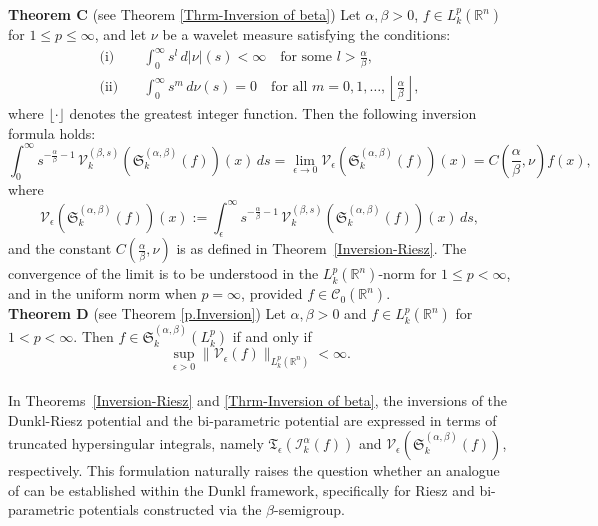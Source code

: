 \documentclass[11pt,a4paper,reqno]{amsproc}
\theoremstyle{definition}
\theoremstyle{remark}
\numberwithin{equation}{section}
\begin{document}
\noindent\textbf{Theorem C} (see Theorem \ref{Thrm-Inversion of beta}) Let \( \alpha, \beta > 0 \), \( f \in L_k^p(\mathbb{R}^n) \) for \( 1 \leq p \leq \infty \), and let \( \nu \) be a wavelet measure satisfying the conditions:
\begin{align*}
\text{(i)} & \quad \int_0^\infty s^{l} \, d|\nu|(s) < \infty \quad \text{for some } l > \frac{\alpha}{\beta}, \\
\text{(ii)} & \quad \int_0^\infty s^m \, d\nu(s) = 0 \quad \text{for all } m = 0, 1, \ldots, \left\lfloor \frac{\alpha}{\beta} \right\rfloor,
\end{align*}
where \( \lfloor \cdot \rfloor \) denotes the greatest integer function. Then the following inversion formula holds:
\[
\int_0^\infty s^{-\frac{\alpha}{\beta}-1} \, \mathcal{V}_k^{(\beta,s)}\left( \mathfrak{S}_k^{(\alpha, \beta)}(f) \right)(x) \, ds 
= \lim_{\epsilon \to 0} \mathcal{V}_\epsilon\left( \mathfrak{S}_k^{(\alpha, \beta)}(f) \right)(x) 
= C\left(\frac{\alpha}{\beta}, \nu\right) f(x),
\]
where
\[
\mathcal{V}_\epsilon\left( \mathfrak{S}_k^{(\alpha, \beta)}(f) \right)(x) := \int_\epsilon^\infty s^{-\frac{\alpha}{\beta}-1} \, \mathcal{V}_k^{(\beta,s)}\left( \mathfrak{S}_k^{(\alpha, \beta)}(f) \right)(x) \, ds,
\]
and the constant \( C\left( \frac{\alpha}{\beta}, \nu \right) \) is as defined in Theorem~\ref{Inversion-Riesz}. The convergence of the limit is to be understood in the \( L_k^p(\mathbb{R}^n) \)-norm for \( 1 \leq p < \infty \), and in the uniform norm when \( p = \infty \), provided \( f \in \mathcal{C}_0(\mathbb{R}^n) \).\\


\textbf{Theorem D} (see Theorem \ref{p.Inversion})  Let $\alpha, \beta>0$ and $f\in L_k^p(\mathbb{R}^n)$ for $1<p<\infty$. Then $f\in \mathfrak{S}_k^{(\alpha, \beta)}(L_k^p) $ if and only if $$\underset{\epsilon>0}{\sup}\|\mathcal{V}_\epsilon (f)\|_{L_k^p(\mathbb{R}^n)} < \infty .$$ \\


 In Theorems~\ref{Inversion-Riesz} and \ref{Thrm-Inversion of beta}, the inversions of the Dunkl-Riesz potential and the bi-parametric potential are expressed in terms of truncated hypersingular integrals, namely \( \mathfrak{T}_\epsilon(\mathcal{I}_k^{\alpha}(f)) \) and \( \mathcal{V}_\epsilon\left( \mathfrak{S}_k^{(\alpha, \beta)}(f) \right) \), respectively. This formulation naturally raises the question whether an analogue of \cite[Theorem 3.1]{Aliev-2013} can be established within the Dunkl framework, specifically for Riesz and bi-parametric potentials constructed via the \(\beta\)-semigroup.
\end{document}
